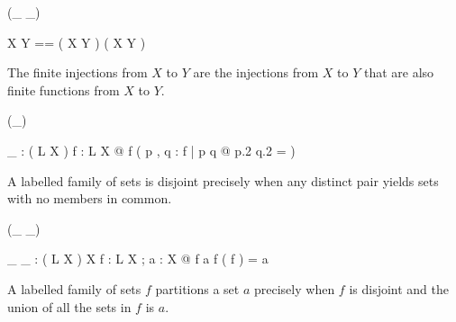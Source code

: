 \documentclass[draft,a4paper,10pt,wd]{isov2}
\begin{document}
\begin{zed}
 \rightassoc (\_ \finj \_)
\end{zed}

\begin{zed}
X \finj Y == ( X \ffun Y ) \cap ( X \pinj Y )
\end{zed}

The finite injections from $X$ to $Y$ are the injections from $X$ to $Y$
that are also finite functions from $X$ to $Y$.


\begin{zed}
\relation (\disjoint \_)
\end{zed}

\begin{gendef}[L,X]
\disjoint \_ : \power ( L \rel \power X )
\where
\forall f : L \rel \power X @
\disjoint f \iff ( \forall p , q : f | p \neq q @ p.2 \cap q.2 = \emptyset )
\end{gendef}

A labelled family of sets is disjoint precisely when any
distinct pair yields sets with no members in common.


\begin{zed}
\relation (\_ \partition \_)
\end{zed}

\begin{gendef}[L,X]
\_ \partition \_ : ( L \rel \power X ) \rel \power X
\where
\forall f : L \rel \power X ; a : \power X @
f \partition a \iff \disjoint f \land \bigcup ( \ran f ) = a
\end{gendef}

A labelled family of sets $f$ partitions a set $a$
precisely when $f$ is disjoint and the union of all the sets in $f$
is $a$.
\end{document}

